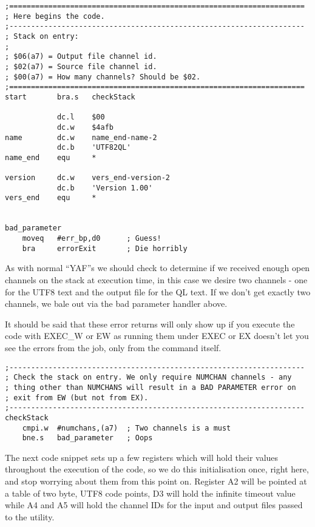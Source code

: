 \begin{lstlisting}[firstnumber=last,caption={Utf82Ql: Job header}]
;====================================================================
; Here begins the code.
;--------------------------------------------------------------------
; Stack on entry:
;
; $06(a7) = Output file channel id.
; $02(a7) = Source file channel id.
; $00(a7) = How many channels? Should be $02.
;====================================================================
start       bra.s   checkStack

            dc.l    $00
            dc.w    $4afb
name        dc.w    name_end-name-2
            dc.b    'UTF82QL'
name_end    equ     *

version     dc.w    vers_end-version-2
            dc.b    'Version 1.00'
vers_end    equ     *


bad_parameter
    moveq   #err_bp,d0      ; Guess!
    bra     errorExit       ; Die horribly
\end{lstlisting}

As with normal ``YAF''s we should check to determine if we received
enough open channels on the stack at execution time, in this case
we desire two channels - one for the UTF8 text and the output file
for the QL text. If we don't get exactly two channels, we bale out
via the bad parameter handler above.

It should be said that these error returns will only show up if you
execute the code with EXEC\_W or EW as running them under EXEC or
EX doesn't let you see the errors from the job, only from the command
itself.

\begin{lstlisting}[firstnumber=last,caption={Utf82Ql: Testing for two channels}]
;--------------------------------------------------------------------
; Check the stack on entry. We only require NUMCHAN channels - any
; thing other than NUMCHANS will result in a BAD PARAMETER error on
; exit from EW (but not from EX).
;--------------------------------------------------------------------
checkStack
    cmpi.w  #numchans,(a7)  ; Two channels is a must
    bne.s   bad_parameter   ; Oops

\end{lstlisting}

The next code snippet sets up a few registers which will hold their
values throughout the execution of the code, so we do this initialisation
once, right here, and stop worrying about them from this point on.
Register A2 will be pointed at a table of two byte, UTF8 code points,
D3 will hold the infinite timeout value while A4 and A5 will hold
the channel IDs for the input and output files passed to the utility.

